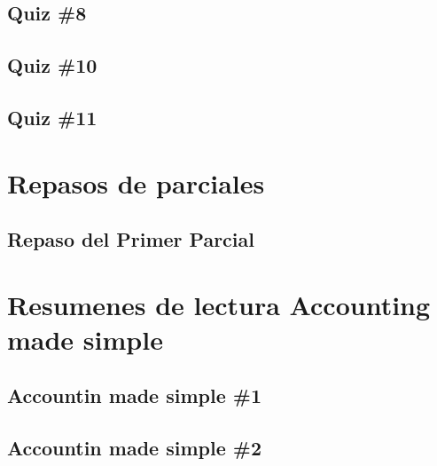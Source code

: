 \documentclass{book}
\begin{document}
\chapter{Quiz \#8}


\chapter{Quiz \#10}


\chapter{Quiz \#11}





\part{Repasos de parciales}
\chapter{Repaso del Primer Parcial}



\part{Resumenes de lectura Accounting made simple}

\chapter{ Accountin made simple \#1}


\chapter{ Accountin made simple \#2}

\end{document}
